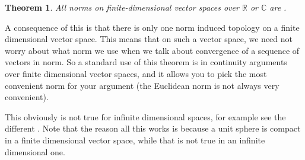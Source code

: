 \documentclass[12pt]{article}
\theoremstyle{theorem}
\newtheorem*{thm}{Theorem}
\theoremstyle{definition}
\begin{document}
\begin{thm}
All norms on finite-dimensional vector spaces over ${\mathbb{R}}$
or ${\mathbb{C}}$
are .
\end{thm}

A consequence of this is that there is only one norm induced topology on a finite dimensional vector space.  This means that on such a vector space, we
need not worry about what norm we use when we talk about convergence of a sequence of vectors in norm.  So a standard use of this theorem is in continuity arguments over finite dimensional vector spaces, and it allows you to pick the most convenient norm for your argument (the Euclidean norm is not always very convenient).

This obviously is not true for infinite dimensional spaces, for example see the different .  Note that the reason all this works is because a unit sphere is compact in a finite dimensional vector space, while that is not true in an infinite dimensional one.
\end{document}
